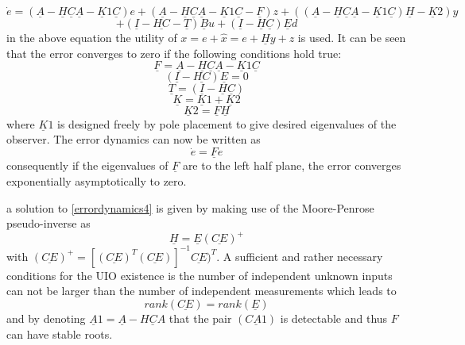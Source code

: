 %
\begin{equation}
\dot{e}= (\underline A-\underline H \underline C \underline A-\underline K1 \underline C)e + (\underline A-\underline H \underline C \underline A-\underline K1 \underline C - \underline F)z+ ((\underline A-\underline H \underline C \underline A-\underline K1 \underline C )\underline H-\underline K2)y
\label{errordynamics}
\end{equation}
\begin{equation*}
+ (\underline I - \underline {HC} - \underline T)\underline Bu	+(\underline I -\underline H\underline C)\underline E d
\label{errordynamics45}
\end{equation*}
in the above equation the utility of $x  = e + \hat{x} = e + \underline Hy+z$ is used. It can be seen that the error converges to zero if the following conditions hold true:
 \begin{equation}
 \underline F = \underline A-\underline H \underline C \underline A-\underline K1 \underline C
 \label{errordynamics3}
 \end{equation}
\begin{equation}
(\underline I - \underline{HC})\underline E = 0
\label{errordynamics4}
\end{equation}
\begin{equation}
\underline T = (\underline I - \underline H\underline C)
\label{errordynamics5}
\end{equation}
\begin{equation}
\underline K = \underline K1 +\underline K2
\label{errordynamics6}
\end{equation}
\begin{equation}
\underline K2 =\underline F \underline H 
\label{errordynamics7}
\end{equation}
where $\underline K1$ is designed freely by pole placement to give desired eigenvalues of the observer. The error dynamics can now be written as 
\begin{equation}
\dot{e} = \underline F e
\label{errordynamics8}
\end{equation}
consequently if the eigenvalues of $\underline F$ are to the left half plane, the error converges exponentially asymptotically to zero. 

a solution to \eqref{errordynamics4} is given by making use of the Moore-Penrose pseudo-inverse as
\begin{equation}
\underline H = \underline E (\underline{CE})^{+}
\label{errordynamics9}
\end{equation}
with $(\underline{CE})^{+} = [(\underline{CE})^{T} (\underline{CE})]^{-1}\underline{CE})^{T} $.
A sufficient and rather necessary conditions for the UIO existence is the number of independent unknown inputs can not be larger than the number of independent measurements which leads to
  \begin{equation}
  rank (\underline{CE}) =rank( \underline E) 
  \label{errordynamics10}
  \end{equation}
  and by denoting $\underline A1 = \underline A - \underline{HCA} $ that the pair $(\underline {CA1})$ is detectable and thus $F$ can have stable roots.
